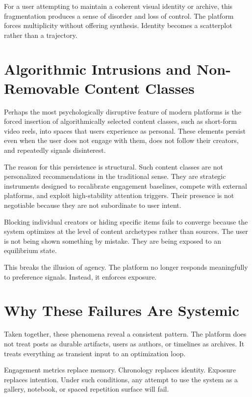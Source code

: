 \documentclass[11pt,oneside]{article}
\begin{document}
For a user attempting to maintain a coherent visual identity or archive, this fragmentation produces a sense of disorder and loss of control. The platform forces multiplicity without offering synthesis. Identity becomes a scatterplot rather than a trajectory.

\section{Algorithmic Intrusions and Non-Removable Content Classes}

Perhaps the most psychologically disruptive feature of modern platforms is the forced insertion of algorithmically selected content classes, such as short-form video reels, into spaces that users experience as personal. These elements persist even when the user does not engage with them, does not follow their creators, and repeatedly signals disinterest.

The reason for this persistence is structural. Such content classes are not personalized recommendations in the traditional sense. They are strategic instruments designed to recalibrate engagement baselines, compete with external platforms, and exploit high-stability attention triggers. Their presence is not negotiable because they are not subordinate to user intent.

Blocking individual creators or hiding specific items fails to converge because the system optimizes at the level of content archetypes rather than sources. The user is not being shown something by mistake. They are being exposed to an equilibrium state.

This breaks the illusion of agency. The platform no longer responds meaningfully to preference signals. Instead, it enforces exposure.

\section{Why These Failures Are Systemic}

Taken together, these phenomena reveal a consistent pattern. The platform does not treat posts as durable artifacts, users as authors, or timelines as archives. It treats everything as transient input to an optimization loop.

Engagement metrics replace memory. Chronology replaces identity. Exposure replaces intention. Under such conditions, any attempt to use the system as a gallery, notebook, or spaced repetition surface will fail.
\end{document}
